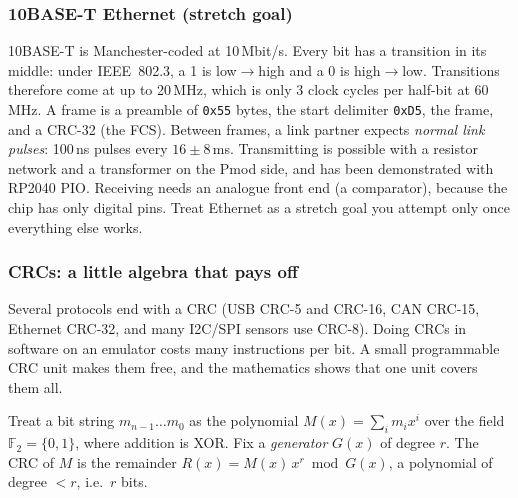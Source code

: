 \subsubsection{10BASE-T Ethernet (stretch goal)}
10BASE-T is Manchester-coded at 10\,Mbit/s. Every bit has a transition in its
middle: under IEEE~802.3, a 1 is low$\to$high and a 0 is high$\to$low.
Transitions therefore come at up to 20\,MHz, which is only 3 clock cycles
per half-bit at 60\,MHz. A frame is a preamble of \texttt{0x55} bytes, the
start delimiter \texttt{0xD5}, the frame, and a CRC-32 (the FCS). Between
frames, a link partner expects \emph{normal link pulses}: 100\,ns pulses
every $16\pm8$\,ms. Transmitting is possible with a resistor network and a
transformer on the Pmod side, and has been demonstrated with RP2040 PIO.
Receiving needs an analogue front end (a comparator), because the chip has
only digital pins. Treat Ethernet as a stretch goal you attempt only once
everything else works.
\begin{center}
\end{center}

\subsubsection{CRCs: a little algebra that pays off}\label{sec:crc}

Several protocols end with a CRC (USB CRC-5 and CRC-16, CAN CRC-15,
Ethernet CRC-32, and many I2C/SPI sensors use CRC-8). Doing CRCs in
software on an emulator costs many instructions per bit. A small
programmable CRC unit makes them free, and the mathematics shows that one
unit covers them all.

\begin{definition}[CRC]
Treat a bit string $m_{n-1}\dots m_0$ as the polynomial
$M(x)=\sum_i m_i x^i$ over the field $\mathbb{F}_2=\{0,1\}$, where addition
is XOR. Fix a \emph{generator} $G(x)$ of degree $r$. The CRC of $M$ is the
remainder $R(x) = M(x)\,x^r \bmod G(x)$, a polynomial of degree $<r$,
i.e.\ $r$ bits.
\end{definition}

